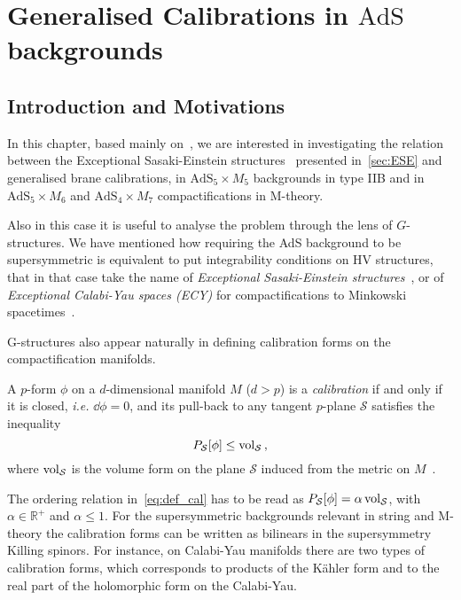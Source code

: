 \documentclass[debug]{phd}
\begin{document}
	\chapter{Generalised Calibrations in \texorpdfstring{$\mathrm{AdS}$}{AdS} backgrounds}
	\label{chapbrane}
			
			\section{Introduction and Motivations}
			In this chapter, based mainly on~\cite{oscar2}, we are interested in investigating the relation between the Exceptional Sasaki-Einstein structures~\cite{AshmoreESE} presented in~\cref{sec:ESE} and generalised brane calibrations, in $\mathrm{AdS}_5 \times M_5$ backgrounds in type IIB and in $\mathrm{AdS}_5 \times M_6$ and $\mathrm{AdS}_4 \times M_7$ compactifications in M-theory.
			
			Also in this case it is useful to analyse the problem through the lens of $G$-structures.
			We have mentioned how requiring the AdS background to be supersymmetric is equivalent to put integrability conditions on HV structures, that in that case take the name of \emph{Exceptional Sasaki-Einstein structures}~\cite{AshmoreESE}, or of \emph{Exceptional Calabi-Yau spaces (ECY)} for compactifications to Minkowski spacetimes~\cite{AshmoreECY}.
			
			G-structures also appear naturally in defining calibration forms on the compactification manifolds. 
			
			A $p$-form $\phi$ on a $d$-dimensional manifold $M$ ($d> p$) is a \emph{calibration} if and only if it is closed, \emph{i.e.} $\dd  \phi =0$, and its pull-back to any tangent $p$-plane $\mathcal{S}$ satisfies the inequality
					\begin{equation}\label{eq:def_cal}
						P_{\mathcal{S}}[\phi] \leq \operatorname{vol}_{\mathcal{S}}\, ,
					\end{equation}
			where $\operatorname{vol}_{\mathcal{S}}$ is the volume form on the plane $\mathcal{S}$ induced from the metric on $M$~\cite{Cal_Geo}.
			
			The ordering relation in~\eqref{eq:def_cal} has to be read as $P_{\mathcal{S}}[\phi] = \alpha  \operatorname{vol}_{\mathcal{S}}$, with $\alpha  \in \mathbb{R}^+$ and $\alpha  \leq 1$.
			For the supersymmetric backgrounds relevant in string and M-theory the calibration forms can be written as bilinears in the supersymmetry Killing spinors. 
			For instance, on Calabi-Yau manifolds there are two types of calibration forms, which corresponds to products of the K\"ahler form and to the real part of the holomorphic form on the Calabi-Yau. 
\end{document}
